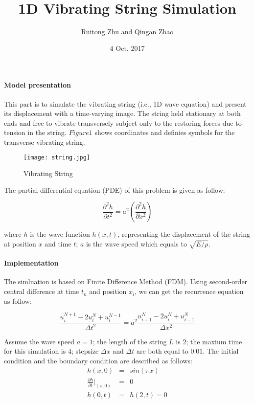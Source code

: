 \documentclass[11pt]{article}
\title{1D Vibrating String Simulation}
\date{4 Oct. 2017}
\author{Ruitong Zhu and Qingan Zhao}
\begin{document}
\paragraph{Model presentation}
This part is to simulate the vibrating string (i.e., 1D wave equation) and present its displacement with a time-varying image. The string held stationary at both ends and free to vibrate transversely subject only to the restoring forces due to tension in the string. $Figure 1$ shows coordinates and definies symbols for the transverse vibrating string. 

\begin{figure}[htb]
	\centering
	\texttt{[image: string.jpg]}       
	\caption{Vibrating String}
\end{figure}

The partial differential equation (PDE) of this problem is given as follow:

\begin{equation}
	\frac{\partial^2 h}{\partial t^2}=a^2\left(\frac{\partial^2 h}{\partial x^2}\right)
\end{equation}

where $h$ is the wave function $h(x,t)$, representing the displacement of the string at position $x$ and time $t$; $a$ is the wave speed which equals to $\sqrt{E/\rho}$.

\paragraph{Implementation}

The simluation is based on Finite Difference Method (FDM). Using second-order central difference at time $t_n$ and position $x_i$, we can get the recurrence equation as follow:

\begin{equation}
\frac{u_{i}^{N+1}-2u_{i}^{N}+u_{i}^{N-1}}{\Delta t^2} = a^2\frac{u_{i+1}^{N}-2u_{i}^{N}+u_{i-1}^{N}}{\Delta x^2}
\end{equation}

Assume the wave speed $a = 1$; the length of the string $L$ is $2$; the maxium time for this simulation is $4$; stepsize $\Delta x$ and $\Delta t$ are both equal to $0.01$. The initial condition and the boundary condition are described as follows:
\begin{eqnarray}
h(x,0)&=&sin(\pi x)\\
\frac{\partial h}{\partial t}\bigg |_{(x,0)}&=&0\\
h(0,t)&=&h(2,t)=0
\end{eqnarray}
\end{document}
